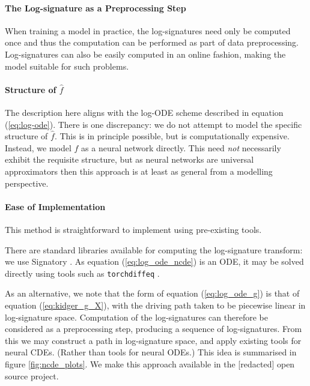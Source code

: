 \documentclass{article}
\begin{document}
\paragraph{The Log-signature as a Preprocessing Step} When training a model in practice, the log-signatures need only be computed once and thus the computation can be performed as part of data preprocessing. Log-signatures can also be easily computed in an online fashion, making the model suitable for such problems. 

\paragraph{Structure of $\widehat{f}$} The description here aligns with the log-ODE scheme described in equation (\ref{eq:log-ode}). There is one discrepancy: we do not attempt to model the specific structure of $\widehat{f}$. This is in principle possible, but is computationally expensive. Instead, we model $\widehat{f}$ as a neural network directly. This need \emph{not} necessarily exhibit the requisite structure, but as neural networks are universal approximators \citep{pinkus, deepandnarrow} then this approach is at least as general from a modelling perspective.

\paragraph{Ease of Implementation}
This method is straightforward to implement using pre-existing tools.

There are standard libraries available for computing the log-signature transform: we use Signatory \citep{signatory}. As equation (\ref{eq:log_ode_ncde}) is an ODE, it may be solved directly using tools such as \texttt{torchdiffeq} \citep{torchdiffeq}.

As an alternative, we note that the form of equation (\ref{eq:log_ode_g}) is that of equation (\ref{eq:kidger_g_X}), with the driving path taken to be piecewise linear in log-signature space. Computation of the log-signatures can therefore be considered as a preprocessing step, producing a sequence of log-signatures. From this we may construct a path in log-signature space, and apply existing tools for neural CDEs. (Rather than tools for neural ODEs.) This idea is summarised in figure \ref{fig:ncde_plots}. We make this approach available in the [redacted] open source project.
\end{document}
